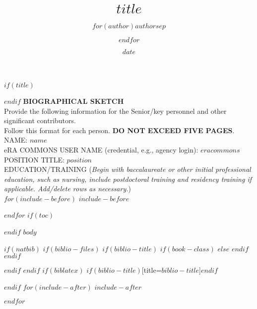 \documentclass[11pt]{article}
\title{$title$}
\author{$for(author)$$author$$sep$ \and $endfor$}
\date{$date$}
\newcommand{\pgline}{\vspace{-6pt}\noindent\makebox[\linewidth]{\rule{\textwidth}{0.6pt}}\newline}
\newcommand{\piinfo}
{\pgline
{\centering
\textbf{BIOGRAPHICAL SKETCH}\\
{\footnotesize
Provide the following information for the Senior/key personnel and other significant contributors.\\
Follow this format for each person.  \textbf{DO NOT EXCEED FIVE PAGES}.\\}}
\pgline
NAME: $name$\vspace{0.5em}\\
eRA COMMONS USER NAME (credential, e.g., agency login): $eracommons$\vspace{0.5em}\\
POSITION TITLE: $position$\vspace{0.5em}\\
EDUCATION/TRAINING (\textit{Begin with baccalaureate or other initial professional education, such as nursing, include postdoctoral training and residency training if applicable. Add/delete rows as necessary.})\vspace{0.5em}\\}
\newenvironment{education}
{%
\bgroup\centering
\tabulinesep=1.5mm
\begin{tabu} to \textwidth {X[3.53,l,m]|X[1,c,m]|X[1,c,m]|X[2.15,l,m]}
\hline
\rowfont[c]{}               %
INSTITUTION AND LOCATION &
DEGREE & 
Completion Date & 
FIELD OF STUDY\\
\hline}
{\end{tabu}\egroup}
\begin{document}
$if(title)$
\maketitle
$endif$
\piinfo
$for(include-before)$
$include-before$

$endfor$
$if(toc)$
\tableofcontents

$endif$
$body$

$if(natbib)$
$if(biblio-files)$
$if(biblio-title)$
$if(book-class)$
\renewcommand\bibname{$biblio-title$}
$else$
\renewcommand\refname{$biblio-title$}
$endif$
$endif$


$endif$
$endif$
$if(biblatex)$
\printbibliography$if(biblio-title)$[title=$biblio-title$]$endif$

$endif$
$for(include-after)$
$include-after$

$endfor$
\end{document}
